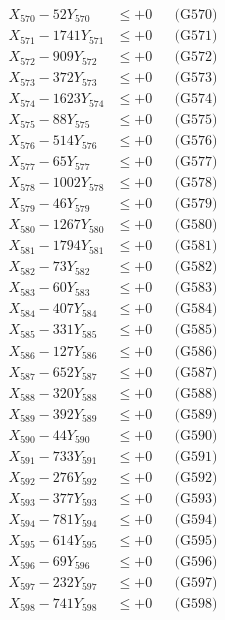 \documentclass[a4paper,10pt]{article}
\begin{document}
{\begin{align}
X_{570} - 52Y_{570} &\leq +0 && \text{(G570)} \\
\allowbreak
X_{571} - 1741Y_{571} &\leq +0 && \text{(G571)} \\
X_{572} - 909Y_{572} &\leq +0 && \text{(G572)} \\
X_{573} - 372Y_{573} &\leq +0 && \text{(G573)} \\
X_{574} - 1623Y_{574} &\leq +0 && \text{(G574)} \\
X_{575} - 88Y_{575} &\leq +0 && \text{(G575)} \\
X_{576} - 514Y_{576} &\leq +0 && \text{(G576)} \\
X_{577} - 65Y_{577} &\leq +0 && \text{(G577)} \\
X_{578} - 1002Y_{578} &\leq +0 && \text{(G578)} \\
X_{579} - 46Y_{579} &\leq +0 && \text{(G579)} \\
X_{580} - 1267Y_{580} &\leq +0 && \text{(G580)} \\
\allowbreak
X_{581} - 1794Y_{581} &\leq +0 && \text{(G581)} \\
X_{582} - 73Y_{582} &\leq +0 && \text{(G582)} \\
X_{583} - 60Y_{583} &\leq +0 && \text{(G583)} \\
X_{584} - 407Y_{584} &\leq +0 && \text{(G584)} \\
X_{585} - 331Y_{585} &\leq +0 && \text{(G585)} \\
X_{586} - 127Y_{586} &\leq +0 && \text{(G586)} \\
X_{587} - 652Y_{587} &\leq +0 && \text{(G587)} \\
X_{588} - 320Y_{588} &\leq +0 && \text{(G588)} \\
X_{589} - 392Y_{589} &\leq +0 && \text{(G589)} \\
X_{590} - 44Y_{590} &\leq +0 && \text{(G590)} \\
\allowbreak
X_{591} - 733Y_{591} &\leq +0 && \text{(G591)} \\
X_{592} - 276Y_{592} &\leq +0 && \text{(G592)} \\
X_{593} - 377Y_{593} &\leq +0 && \text{(G593)} \\
X_{594} - 781Y_{594} &\leq +0 && \text{(G594)} \\
X_{595} - 614Y_{595} &\leq +0 && \text{(G595)} \\
X_{596} - 69Y_{596} &\leq +0 && \text{(G596)} \\
X_{597} - 232Y_{597} &\leq +0 && \text{(G597)} \\
X_{598} - 741Y_{598} &\leq +0 && \text{(G598)} \\

\end{align}}
\end{document}
